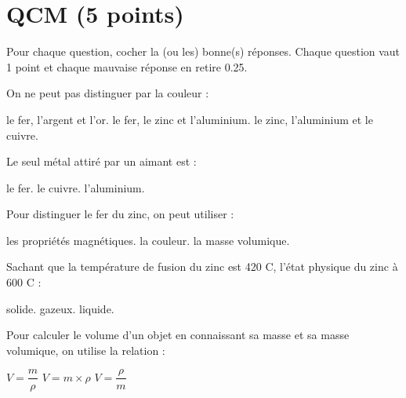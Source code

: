 \section{QCM (5 points)}\label{ex:qcm}
Pour chaque question, cocher la (ou les) bonne(s) réponses.
Chaque question vaut 1 point et chaque mauvaise réponse en retire \num{0.25}.

\begin{questions}
\question[1] On ne peut pas distinguer par la couleur :\\
\begin{oneparcheckboxes}
	\choice le fer, l'argent et l'or.
	\correctchoice le fer, le zinc et l'aluminium.
	\choice le zinc, l'aluminium et le cuivre.
\end{oneparcheckboxes}

\question[1] Le seul métal attiré par un aimant est :\\
\begin{oneparcheckboxes}
	\correctchoice le fer.
	\choice le cuivre.
	\choice l'aluminium.
\end{oneparcheckboxes}

\question[1] Pour distinguer le fer du zinc, on peut utiliser :\\
\begin{oneparcheckboxes}
	\correctchoice les propriétés magnétiques.
	\choice la couleur.
	\correctchoice la masse volumique.	
\end{oneparcheckboxes}

\question[1] Sachant que la température de fusion du zinc est 420 \degree C, l'état physique du zinc à  600 \degree C :\\
\begin{oneparcheckboxes}
	\choice solide.
	\choice gazeux.
	\correctchoice liquide.	
\end{oneparcheckboxes}

\question[1] Pour calculer le volume d'un objet en connaissant sa masse et sa masse volumique, on utilise la relation :\\
\begin{oneparcheckboxes}
	\correctchoice $V = \dfrac{m}{\rho}$
	\choice $V = m \times \rho$
	\choice $V = \dfrac{\rho}{m}$	
\end{oneparcheckboxes}


\end{questions}
